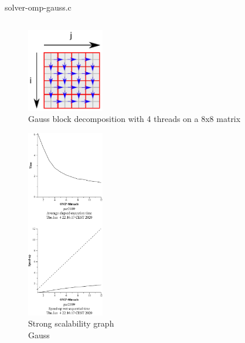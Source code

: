 \begin{listing}[H]
    \caption{solver-omp-gauss.c}%
    \label{lst:solver-omp-gauss}
    \inputminted[firstline=57,lastline=89]{c}{code/solver-omp.c}
\end{listing}




\begin{figure}[H]
    \centering
    \includegraphics[width=0.3\textwidth]{gauss_blocks}
    \caption{Gauss block decomposition with 4 threads on a 8x8 matrix}%
    \label{fig:blocks-gauss}
\end{figure}



\begin{figure}[H]
    \centering
    \includegraphics[width=0.3\textwidth]{heat-omp-strong-gauss-crop}
    \caption{Strong scalability graph \\ Gauss}%
    \label{fig:strong-gauss}
\end{figure}

